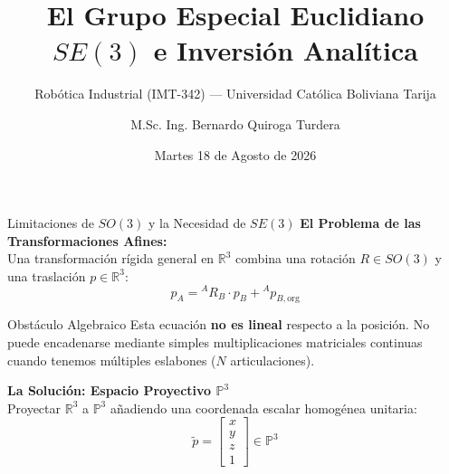 \documentclass[aspectratio=169]{beamer}
\title[Transformaciones Homogéneas SE(3)]{El Grupo Especial Euclidiano $SE(3)$ e Inversión Analítica}
\subtitle{Robótica Industrial (IMT-342) — Universidad Católica Boliviana Tarija}
\author[B. Quiroga Turdera]{M.Sc. Ing. Bernardo Quiroga Turdera}
\date{Martes 18 de Agosto de 2026}
\begin{document}
\begin{frame}
    \titlepage
\end{frame}

\begin{frame}{Limitaciones de $SO(3)$ y la Necesidad de $SE(3)$}
    \textbf{El Problema de las Transformaciones Afines:} \\
    Una transformación rígida general en $\mathbb{R}^3$ combina una rotación $R \in SO(3)$ y una traslación $p \in \mathbb{R}^3$:
    \begin{equation*}
        p_A = {}^{A}R_B \cdot p_B + {}^{A}p_{B,\text{org}}
    \end{equation*}
    
    \vspace{0.2cm}
    \begin{alertblock}{Obstáculo Algebraico}
        Esta ecuación \textbf{no es lineal} respecto a la posición. No puede encadenarse mediante simples multiplicaciones matriciales continuas cuando tenemos múltiples eslabones ($N$ articulaciones).
    \end{alertblock}

    \vspace{0.2cm}
    \textbf{La Solución: Espacio Proyectivo $\mathbb{P}^3$} \\
    Proyectar $\mathbb{R}^3$ a $\mathbb{P}^3$ añadiendo una coordenada escalar homogénea unitaria:
    \begin{equation*}
        \tilde{p} = \begin{bmatrix} x \\ y \\ z \\ 1 \end{bmatrix} \in \mathbb{P}^3
    \end{equation*}
\end{frame}
\end{document}

